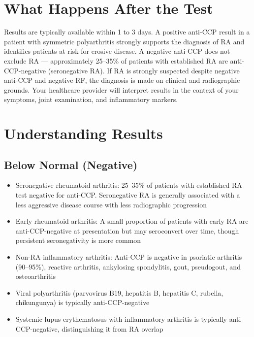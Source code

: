 \section*{What Happens After the Test}
Results are typically available within 1 to 3 days. A positive anti-CCP result in a patient with symmetric polyarthritis strongly supports the diagnosis of RA and identifies patients at risk for erosive disease. A negative anti-CCP does not exclude RA --- approximately 25--35\% of patients with established RA are anti-CCP-negative (seronegative RA). If RA is strongly suspected despite negative anti-CCP and negative RF, the diagnosis is made on clinical and radiographic grounds. Your healthcare provider will interpret results in the context of your symptoms, joint examination, and inflammatory markers.

\section*{Understanding Results}

\subsection*{Below Normal (Negative)}
\begin{itemize}
  \item Seronegative rheumatoid arthritis: 25--35\% of patients with established RA test negative for anti-CCP. Seronegative RA is generally associated with a less aggressive disease course with less radiographic progression
  \item Early rheumatoid arthritis: A small proportion of patients with early RA are anti-CCP-negative at presentation but may seroconvert over time, though persistent seronegativity is more common
  \item Non-RA inflammatory arthritis: Anti-CCP is negative in psoriatic arthritis (90--95\%), reactive arthritis, ankylosing spondylitis, gout, pseudogout, and osteoarthritis
  \item Viral polyarthritis (parvovirus B19, hepatitis B, hepatitis C, rubella, chikungunya) is typically anti-CCP-negative
  \item Systemic lupus erythematosus with inflammatory arthritis is typically anti-CCP-negative, distinguishing it from RA overlap
\end{itemize}

